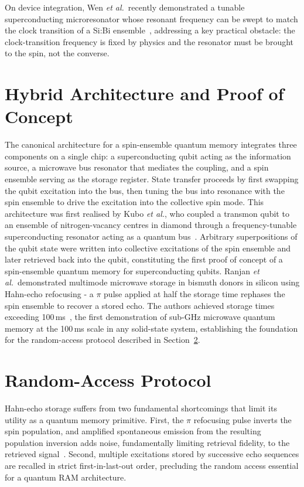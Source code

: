 \documentclass[technote]{IEEEtran}
\begin{document}
On device integration, Wen \textit{et al.}\ recently demonstrated a tunable superconducting microresonator whose resonant frequency can be swept to match the clock transition of a Si:Bi ensemble~\cite{wen2025}, addressing a key practical obstacle: the clock-transition frequency is fixed by physics and the resonator must be brought to the spin, not the converse.


\section{Hybrid Architecture and Proof of Concept}
\label{sec:hybrid}

The canonical architecture for a spin-ensemble quantum memory integrates three components on a single chip: a superconducting qubit acting as the information source, a microwave bus resonator that mediates the coupling, and a spin ensemble serving as the storage register. State transfer proceeds by first swapping the qubit excitation into the bus, then tuning the bus into resonance with the spin ensemble to drive the excitation into the collective spin mode. This architecture was first realised by Kubo \textit{et al.}, who coupled a transmon qubit to an ensemble of nitrogen-vacancy centres in diamond through a frequency-tunable superconducting resonator acting as a quantum bus~\cite{kubo2011}. Arbitrary superpositions of the qubit state were written into collective excitations of the spin ensemble and later retrieved back into the qubit, constituting the first proof of concept of a spin-ensemble quantum memory for superconducting qubits. Ranjan \textit{et al.}\ demonstrated multimode microwave storage in bismuth donors in silicon using Hahn-echo refocusing - a $\pi$ pulse applied at half the storage time rephases the spin ensemble to recover a stored echo. The authors achieved storage times exceeding 100\,ms~\cite{ranjan2020}, the first demonstration of sub-GHz microwave quantum memory at the 100\,ms scale in any solid-state system, establishing the foundation for the random-access protocol described in Section~\ref{sec:wurst}.

\section{Random-Access Protocol}
\label{sec:wurst}

Hahn-echo storage suffers from two fundamental shortcomings that limit its utility as a quantum memory primitive. First, the $\pi$ refocusing pulse inverts the spin population, and amplified spontaneous emission from the resulting population inversion adds noise, fundamentally limiting retrieval fidelity, to the retrieved signal~\cite{ruggiero2009}. Second, multiple excitations stored by successive echo sequences are recalled in strict first-in-last-out order, precluding the random access essential for a quantum RAM architecture.
\end{document}
